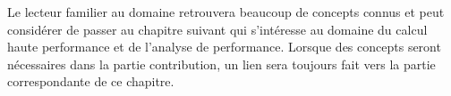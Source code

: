 Le lecteur familier au domaine retrouvera beaucoup de concepts connus et peut considérer de passer au chapitre suivant qui s'intéresse au domaine du calcul haute performance et de l'analyse de performance. Lorsque des concepts seront nécessaires dans la partie contribution, un lien sera toujours fait vers la partie correspondante de ce chapitre.













